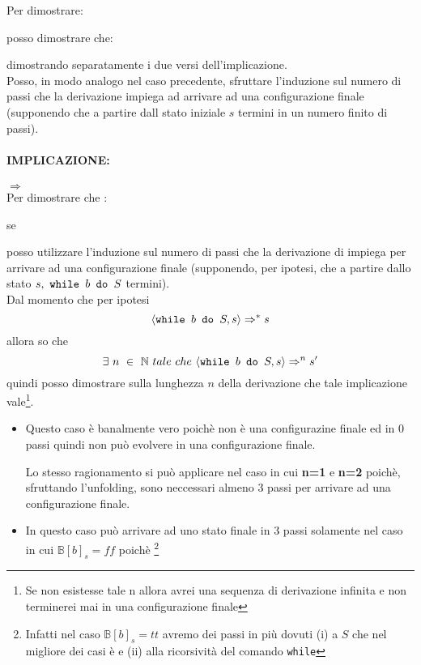 {
	Per dimostrare:
	\begin{center}
	\exFour{}
	\end{center}
	posso dimostrare che:
	\begin{center}
	\exFourIff{}
	\end{center}
	dimostrando separatamente i due versi dell'implicazione. \\
	
	Posso, in modo analogo nel caso precedente, sfruttare l'induzione sul
	numero di passi che la derivazione \exFourRS{} impiega ad arrivare ad una
	configurazione finale (supponendo che a partire dall stato iniziale $s$
	termini in un numero finito di passi).\\
		
	\paragraph{IMPLICAZIONE: } $\Longrightarrow{}$\\
	Per dimostrare che :
	\begin{center}
	se \exFourLtR{}
	\end{center}
	posso utilizzare l'induzione sul numero di passi che la derivazione di 
	 impiega per arrivare ad una configurazione finale 
	(supponendo, per ipotesi, che a partire dallo stato $s,~\mbox{\normalfont{\texttt{while }}} b \textrm{\normalfont{\texttt{ do }}} S$
	termini).\\
	
	Dal momento che per ipotesi \[ \langle{}\mbox{\normalfont{\texttt{while }}} b \textrm{\normalfont{\texttt{ do }}} S, s\rangle{}\Rightarrow^{*}s \] allora so che 
	\[ \exists{}~n~\in~\mathbb{N}~tale~che~\langle{}\mbox{\normalfont{\texttt{while }}} b \textrm{\normalfont{\texttt{ do }}} S, s\rangle{}\Rightarrow^{n}s'  \]quindi
	posso dimostrare sulla lunghezza $n$ della derivazione che tale
	implicazione vale\footnote{Se non esistesse tale n allora avrei una sequenza di derivazione infinita e non terminerei mai in una configurazione finale}.\\
	\begin{itemize}
	\item {} Questo caso è banalmente vero poichè 
	 non è una configurazine finale ed in 0 passi quindi
	non può evolvere in una configurazione finale. 
	
	Lo stesso ragionamento si
	può applicare nel caso in cui \textbf{n=1} e \textbf{n=2} poichè,
	sfruttando l'unfolding, sono neccessari almeno 3 passi per arrivare ad una
	configurazione finale.\\
	
	\item {} In questo caso  può arrivare ad uno stato finale
	in 3 passi solamente nel caso in cui $\mathbb{B}[b]_s=ff$ poichè
	\footnote{Infatti nel caso $\mathbb{B}[b]_s=tt$ avremo dei passi in più 
	dovuti (i) a $S$ che nel migliore dei casi è \skipistr{} e (ii) alla
	ricorsività del comando \texttt{while}}


\end{itemize}}
